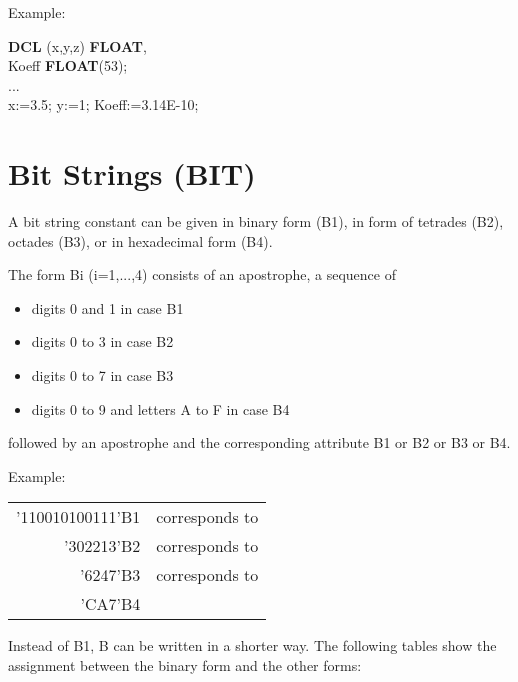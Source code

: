 Example:

{\bf DCL} (x,y,z) {\bf FLOAT},\\
\x Koeff {\bf FLOAT}(53);\\
... \\
x:=3.5; y:=1; Koeff:=3.14E-10;

\section{Bit Strings (BIT)}  %

A bit string constant can be given in binary form (B1), in form of
tetrades (B2), octades (B3), or in hexadecimal form (B4).

The form Bi (i=1,...,4) consists of an apostrophe, a sequence of
\begin{itemize}
\item digits 0 and 1 in case B1
\item digits 0 to 3 in case B2
\item digits 0 to 7 in case B3
\item digits 0 to 9 and letters A to F in case B4
\end{itemize}
followed by an apostrophe and the corresponding attribute B1 or B2 or
B3 or B4.

Example:

\begin{tabular}{rl}
'110010100111'B1 & corresponds to\\
      '302213'B2 & corresponds to\\
        '6247'B3 & corresponds to\\
         'CA7'B4 & \\
\end{tabular}

Instead of B1, B can be written in a shorter way. The following tables
show the assignment between the binary form and the other forms:

